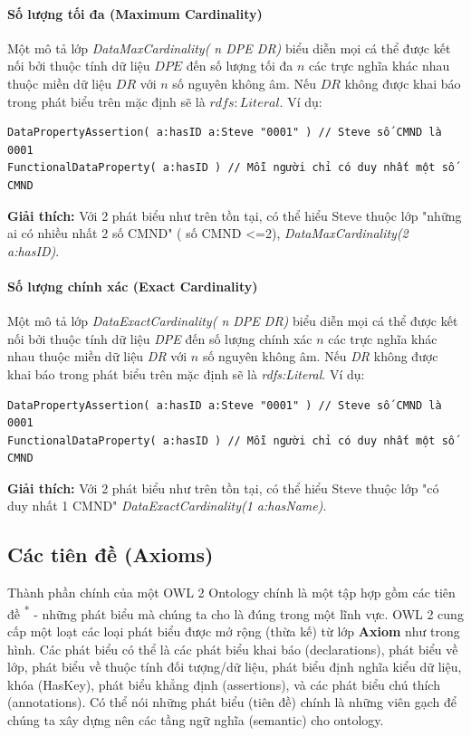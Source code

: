\paragraph{Số lượng tối đa (Maximum Cardinality)} Một mô tả lớp \textit{DataMaxCardinality( n DPE DR)} biểu diễn mọi cá thể được kết nối bởi thuộc tính dữ liệu $DPE$ đến số lượng tối đa $n$ các trực nghĩa khác nhau thuộc miền dữ liệu  $DR$ với $n$ số nguyên không âm. Nếu $DR$ không được khai báo trong phát biểu trên mặc định sẽ là $rdfs:Literal$. Ví dụ:
\begin{verbatim}
DataPropertyAssertion( a:hasID a:Steve "0001" ) // Steve số CMND là 0001
FunctionalDataProperty( a:hasID ) // Mỗi người chỉ có duy nhất một số CMND
\end{verbatim}
\textbf{Giải thích:} Với 2 phát biểu như trên tồn tại, có thể hiểu Steve thuộc lớp "những ai có nhiều nhất 2 số CMND" ( số CMND <=2), \textit{DataMaxCardinality(2 a:hasID)}.

\paragraph{Số lượng chính xác (Exact Cardinality)} Một mô tả lớp \textit{DataExactCardinality( n DPE DR)}  biểu diễn mọi cá thể được kết nối bởi thuộc tính dữ liệu \textit{DPE} đến số lượng chính xác $n$ các trực nghĩa khác nhau thuộc miền dữ liệu  \textit{DR} với $n$ số nguyên không âm. Nếu \textit{DR} không được khai báo trong phát biểu trên mặc định sẽ là \textit{rdfs:Literal}. Ví dụ:
\begin{verbatim}
DataPropertyAssertion( a:hasID a:Steve "0001" ) // Steve số CMND là 0001
FunctionalDataProperty( a:hasID ) // Mỗi người chỉ có duy nhất một số CMND
\end{verbatim}
\textbf{Giải thích:} Với 2 phát biểu như trên tồn tại, có thể hiểu Steve thuộc lớp "có duy nhất 1 CMND" \textit{DataExactCardinality(1 a:hasName)}.

\subsection{Các tiên đề (Axioms)}
{\let\thefootnote\relax{}
}
Thành phần chính của một OWL 2 Ontology chính là một tập hợp gồm các tiên đề \textsuperscript{*} - những phát biểu mà chúng ta cho là đúng trong một lĩnh vực. OWL 2 cung cấp một loạt các loại phát biểu được mở rộng (thừa kế) từ lớp \textbf{Axiom} như trong hình. Các phát biểu có thể là các phát biểu khai báo (declarations), phát biểu về lớp, phát biểu về thuộc tính đối tượng/dữ liệu, phát biểu định nghĩa kiểu dữ liệu, khóa (HasKey), phát biểu khẳng định (assertions), và các phát biểu chú thích (annotations). Có thể nói những phát biểu (tiên đề) chính là những viên gạch để chúng ta xây dựng nên các tầng ngữ nghĩa (semantic) cho ontology.

